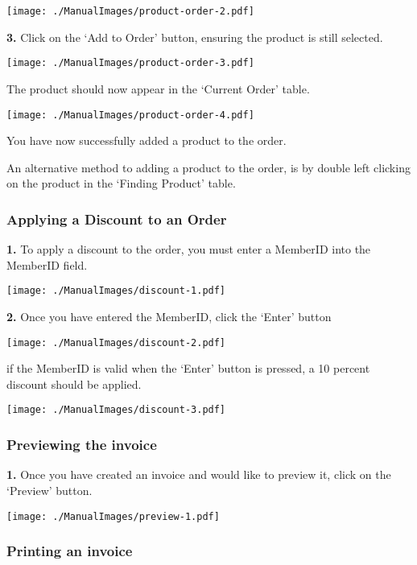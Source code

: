 \texttt{[image: ./ManualImages/product-order-2.pdf]}

\textbf{3.} Click on the `Add to Order' button, ensuring the product is still selected.

\texttt{[image: ./ManualImages/product-order-3.pdf]}

The product should now appear in the `Current Order' table.

\texttt{[image: ./ManualImages/product-order-4.pdf]}

You have now successfully added a product to the order.

An alternative method to adding a product to the order, is by double left clicking on the product in the `Finding Product' table.

\pagebreak
\subsubsection{Applying a Discount to an Order}
\label{fig:Applying a Discount to an Order}

\textbf{1.} To apply a discount to the order, you must enter a MemberID into the MemberID field.

\texttt{[image: ./ManualImages/discount-1.pdf]}

\textbf{2.} Once you have entered the MemberID, click the `Enter' button

\texttt{[image: ./ManualImages/discount-2.pdf]}

\pagebreak

if the MemberID is valid when the `Enter' button is pressed, a 10 percent discount should be applied.

\texttt{[image: ./ManualImages/discount-3.pdf]}

\pagebreak
\subsubsection{Previewing the invoice}
\label{fig:Previewing the invoice}

\textbf{1.} Once you have created an invoice and would like to preview it, click on the `Preview' button.

\texttt{[image: ./ManualImages/preview-1.pdf]}

\pagebreak
\subsubsection{Printing an invoice}
\label{fig:Printing an invoice}

